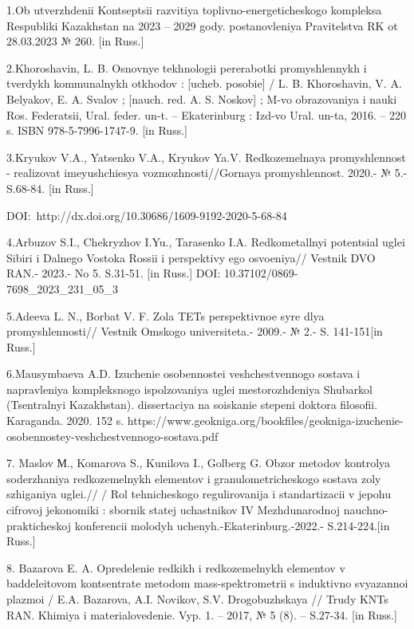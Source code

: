\begin{noparindent}{2}
1.Ob utverzhdenii Kontseptsii razvitiya toplivno-energeticheskogo
kompleksa Respubliki Kazakhstan na 2023 -- 2029 gody. postanovleniya
Pravitel\textquotesingle stva RK ot 28.03.2023 № 260. {[}in Russ.{]}

2.Khoroshavin, L. B. Osnovnye tekhnologii pererabotki promyshlennykh i
tverdykh kommunal\textquotesingle nykh otkhodov : {[}ucheb. posobie{]} /
L. B. Khoroshavin, V. A. Belyakov, E. A. Svalov ; {[}nauch. red. A. S.
Noskov{]} ; M-vo obrazovaniya i nauki Ros. Federatsii, Ural. feder.
un-t. -- Ekaterinburg : Izd-vo Ural. un-ta, 2016. -- 220 s. ISBN
978-5-7996-1747-9. {[}in Russ.{]}

3.Kryukov V.A., Yatsenko V.A., Kryukov Ya.V.
Redkozemel\textquotesingle naya promyshlennost\textquotesingle{} -
realizovat\textquotesingle{} imeyushchiesya vozmozhnosti//Gornaya
promyshlennost\textquotesingle. 2020.- № 5.-S.68-84. {[}in Russ.{]}

DOI:~http://dx.doi.org/10.30686/1609-9192-2020-5-68-84

4.Arbuzov S.I., Chekryzhov I.Yu., Tarasenko I.A.
Redkometall\textquotesingle nyi potentsial uglei Sibiri i
Dal\textquotesingle nego Vostoka Rossii i perspektivy ego osvoeniya//
Vestnik DVO RAN.- 2023.- No 5. S.31-51. {[}in Russ.{]} DOI:
10.37102/0869-7698\_2023\_231\_05\_3

5.Adeeva L. N., Borbat V. F. Zola TETs perspektivnoe
syr\textquotesingle e dlya promyshlennosti// Vestnik Omskogo
universiteta.- 2009.- № 2.- S. 141-151{[}in Russ.{]}

6.Mausymbaeva A.D. Izuchenie osobennostei veshchestvennogo sostava i
napravleniya kompleksnogo ispol\textquotesingle zovaniya uglei
mestorozhdeniya Shubarkol\textquotesingle{}
(Tsentral\textquotesingle nyi Kazakhstan). dissertaciya na soiskanie
stepeni doktora filosofii. Karaganda. 2020. 152 s.
https://www.geokniga.org/bookfiles/geokniga-izuchenie-osobennostey-veshchestvennogo-sostava.pdf

7. Maslov М., Komarova S., Kunilova I., Gol\textquotesingle berg G.
Obzor metodov kontrolya soderzhaniya redkozemel\textquotesingle nykh
elementov i granulometricheskogo sostava zoly szhiganiya uglei.// /
Rol\textquotesingle{} tehnicheskogo regulirovanija i standartizacii v
jepohu cifrovoj jekonomiki : sbornik statej uchastnikov IV
Mezhdunarodnoj nauchno-prakticheskoj konferencii molodyh
uchenyh.-Ekaterinburg.-2022.- S.214-224.{[}in Russ.{]}

8. Bazarova E. A. Opredelenie redkikh i redkozemel\textquotesingle nykh
elementov v baddeleitovom kontsentrate metodom mass-spektrometrii s
induktivno svyazannoi plazmoi / E.A. Bazarova, A.I. Novikov, S.V.
Drogobuzhskaya // Trudy KNTs RAN. Khimiya i materialovedenie. Vyp. 1. --
2017, № 5 (8). -- S.27-34. {[}in Russ.{]}


\end{noparindent}
